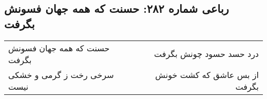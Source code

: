 \begin{center}
\section*{رباعی شماره ۲۸۲: حسنت که همه جهان فسونش بگرفت}
\label{sec:0282}
\begin{longtable}{l p{0.5cm} r}
حسنت که همه جهان فسونش بگرفت
&&
درد حسد حسود چونش بگرفت
\\
سرخی رخت ز گرمی و خشکی نیست
&&
از بس عاشق که کشت خونش بگرفت
\\
\end{longtable}
\end{center}
